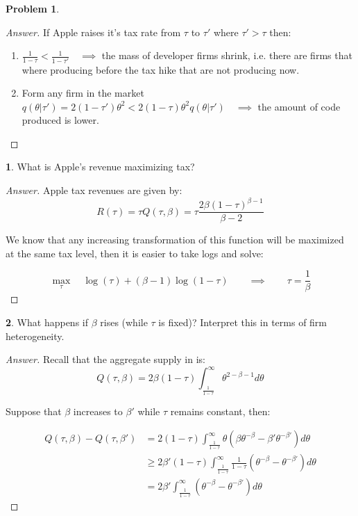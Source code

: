 \documentclass[12pt]{article}
\theoremstyle{definition}
\newtheorem{problem}{Problem}
\newtheorem{subproblem}{}[problem]
\newcommand{\qiq}{\qquad \implies \qquad}
\begin{document}
\begin{problem}
\begin{proof}[Answer]
If Apple raises it's tax rate from $\tau$ to $\tau'$ where $\tau'>\tau$ then:
\begin{enumerate}
    \item $\frac{1}{1-\tau} < \frac{1}{1-\tau'} \quad \implies$ the mass of developer firms shrink, i.e. there are firms that where producing before the tax hike that are not producing now.
    \item Form any firm in the market $q(\theta|\tau')=2(1-\tau')\theta^2 < 2(1-\tau)\theta^2 q(\theta|\tau') \quad \implies$ the amount of code produced is lower.
\end{enumerate}


\end{proof}

\begin{subproblem}
What is Apple's revenue maximizing tax?
\end{subproblem}

\begin{proof}[Answer]
Apple tax revenues are given by:
$$R(\tau) = \tau Q(\tau, \beta) = \tau\frac{2\beta(1-\tau)^{\beta-1}}{\beta-2} $$

We know that any increasing transformation of this function will be maximized at the same tax level, then it is easier to take logs and solve:

$$\max_{\tau}\quad \log{(\tau)} + (\beta-1)\log{(1-\tau)} \qiq \boxed{\tau = \frac{1}{\beta}}$$

\end{proof}

\begin{subproblem}
What happens if $\beta$ rises (while $\tau$ is fixed)? Interpret this in terms of firm heterogeneity.
\end{subproblem}
\begin{proof}[Answer]
Recall that the aggregate supply in is:
$$Q(\tau, \beta) = 2\beta(1-\tau)\int_{\frac{1}{1-\tau}}^{\infty}{\theta^{2-\beta-1}d\theta}$$

Suppose that $\beta$ increases to $\beta'$ while $\tau$ remains constant, then:

\begin{align*}
    Q(\tau, \beta) - Q(\tau, \beta') &= 2(1-\tau)\int_{\frac{1}{1-\tau}}^{\infty}{\theta(\beta\theta^{-\beta}-\beta'\theta^{-\beta'})d\theta} \\
    & \geq 2\beta'(1-\tau)\int_{\frac{1}{1-\tau}}^{\infty}{\frac{1}{1-\tau}(\theta^{-\beta}-\theta^{-\beta'})d\theta} \\
    &= 2\beta'\int_{\frac{1}{1-\tau}}^{\infty}{(\theta^{-\beta}-\theta^{-\beta'})d\theta}
\end{align*}


\end{proof}
\end{problem}
\end{document}
